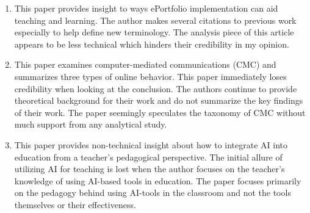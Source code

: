 \documentclass[a4paper]{article}
\begin{document}
\begin{enumerate}
    \item This paper provides insight to ways ePortfolio implementation can aid teaching and learning. The author makes several citations to previous work especially to help define new terminology. The analysis piece of this article appears to be less technical which hinders their credibility in my opinion. \cite{pospisilova_reforming_2023}
    
    \item This paper examines computer-mediated communications (CMC) and summarizes three types of online behavior. This paper immediately loses credibility when looking at the conclusion. The authors continue to provide theoretical background for their work and do not summarize the key findings of their work. The paper seemingly speculates the taxonomy of CMC without much support from any analytical study. \cite{kaye_the_2022}
    
    \item This paper provides non-technical insight about how to integrate AI into education from a teacher's pedagogical perspective. The initial allure of utilizing AI for teaching is lost when the author focuses on the teacher's knowledge of using AI-based tools in education. The paper focuses primarily on the pedagogy behind using AI-tools in the classroom and not the tools themselves or their effectiveness. \cite{celik_towards_2023}
\end{enumerate}
\end{document}
